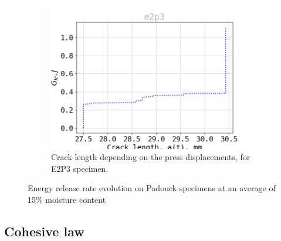 \begin{figure}[H]
\begin{subfigure}{0.48\linewidth}
	\centering
	\includegraphics[scale=0.3]{Figures/e2p3_G}
	\decoRule
	\caption[Crack length E2P3]{Crack length depending on the press displacements, for E2P3 specimen.}
	\label{fig:E2P3_G}
\end{subfigure}
\caption{Energy release rate evolution on Padouck specimens at an average of 15\% moisture content}
\label{E2p_G}
\end{figure}
\newpage
\subsection{Cohesive law}

